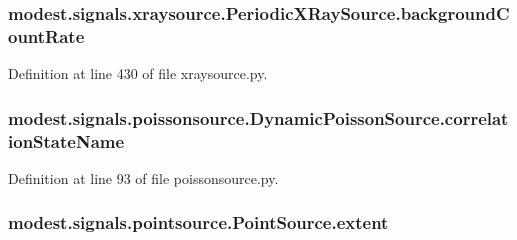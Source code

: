 \subsubsection[{\texorpdfstring{background\+Count\+Rate}{backgroundCountRate}}]{\setlength{\rightskip}{0pt plus 5cm}modest.\+signals.\+xraysource.\+Periodic\+X\+Ray\+Source.\+background\+Count\+Rate}\hypertarget{classmodest_1_1signals_1_1xraysource_1_1PeriodicXRaySource_a3a04d3f0609b7454efc4ef9cdcd7b219}{}\label{classmodest_1_1signals_1_1xraysource_1_1PeriodicXRaySource_a3a04d3f0609b7454efc4ef9cdcd7b219}


Definition at line 430 of file xraysource.\+py.

\subsubsection[{\texorpdfstring{correlation\+State\+Name}{correlationStateName}}]{\setlength{\rightskip}{0pt plus 5cm}modest.\+signals.\+poissonsource.\+Dynamic\+Poisson\+Source.\+correlation\+State\+Name\hspace{0.3cm}{\ttfamily [inherited]}}\hypertarget{classmodest_1_1signals_1_1poissonsource_1_1DynamicPoissonSource_ac7f62303bb8a417a1ddefb032c707bcd}{}\label{classmodest_1_1signals_1_1poissonsource_1_1DynamicPoissonSource_ac7f62303bb8a417a1ddefb032c707bcd}


Definition at line 93 of file poissonsource.\+py.

\subsubsection[{\texorpdfstring{extent}{extent}}]{\setlength{\rightskip}{0pt plus 5cm}modest.\+signals.\+pointsource.\+Point\+Source.\+extent\hspace{0.3cm}{\ttfamily [inherited]}}\hypertarget{classmodest_1_1signals_1_1pointsource_1_1PointSource_a984b5a75c9e94cb3527707b9ac976f9e}{}\label{classmodest_1_1signals_1_1pointsource_1_1PointSource_a984b5a75c9e94cb3527707b9ac976f9e}


